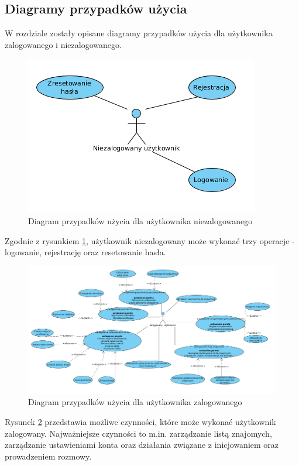 \documentclass{article}
\begin{document}
    \subsection{Diagramy przypadków użycia}
    W rozdziale zostały opisane diagramy przypadków użycia dla użytkownika zalogowanego i niezalogowanego.

    \begin{figure}[H]
      \centering
        \includegraphics[width=1.0\linewidth]{assets/dpu1.png}
        \caption[]{Diagram przypadków użycia dla użytkownika niezalogowanego}
        \label{fig:dpu1}
    \end{figure}

    Zgodnie z rysunkiem \ref{fig:dpu1}, użytkownik niezalogowany może wykonać trzy operacje - logowanie, rejestrację oraz resetowanie hasła.

    \begin{figure}[H]
      \centering
        \includegraphics[width=1.0\linewidth]{assets/dpu2.png}
        \caption[]{Diagram przypadków użycia dla użytkownika zalogowanego}
        \label{fig:dpu2}
    \end{figure}

    Rysunek \ref{fig:dpu2} przedstawia możliwe czynności, które może wykonać użytkownik zalogowany. Najważniejsze czynności to m.in. zarządzanie listą znajomych, zarządzanie ustawieniami konta oraz działania związane z inicjowaniem oraz prowadzeniem rozmowy.
\end{document}
